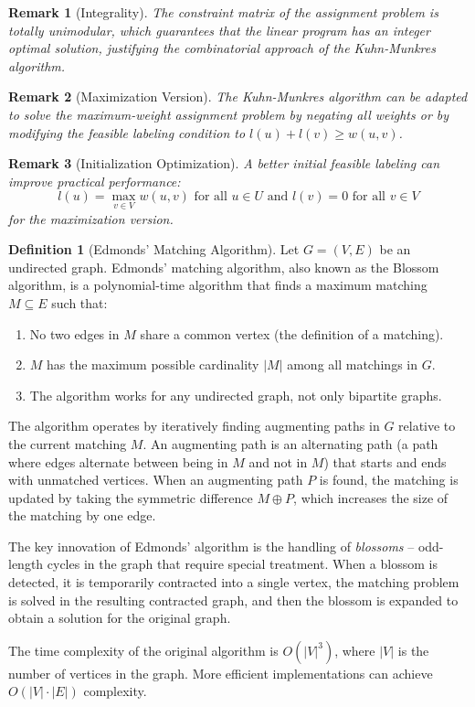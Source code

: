 \documentclass{article}
\newtheorem{remark}{Remark}
\theoremstyle{definition}
\newtheorem{definition}{Definition}
\begin{document}
\begin{remark}[Integrality]
The constraint matrix of the assignment problem is totally unimodular, which guarantees that the linear program has an integer optimal solution, justifying the combinatorial approach of the Kuhn-Munkres algorithm.
\end{remark}


\begin{remark}[Maximization Version]
The Kuhn-Munkres algorithm can be adapted to solve the maximum-weight assignment problem by negating all weights or by modifying the feasible labeling condition to $l(u) + l(v) \geq w(u,v)$.
\end{remark}

\begin{remark}[Initialization Optimization]
A better initial feasible labeling can improve practical performance:
\begin{equation}
l(u) = \max_{v \in V} w(u,v) \text{ for all } u \in U \text{ and } l(v) = 0 \text{ for all } v \in V
\end{equation}
for the maximization version.
\end{remark}
\begin{definition}[Edmonds' Matching Algorithm]
Let $G = (V, E)$ be an undirected graph. Edmonds' matching algorithm, also known as the Blossom algorithm, is a polynomial-time algorithm that finds a maximum matching $M \subseteq E$ such that:
\begin{enumerate}
  \item No two edges in $M$ share a common vertex (the definition of a matching).
  \item $M$ has the maximum possible cardinality $|M|$ among all matchings in $G$.
  \item The algorithm works for any undirected graph, not only bipartite graphs.
\end{enumerate}

The algorithm operates by iteratively finding augmenting paths in $G$ relative to the current matching $M$. An augmenting path is an alternating path (a path where edges alternate between being in $M$ and not in $M$) that starts and ends with unmatched vertices. When an augmenting path $P$ is found, the matching is updated by taking the symmetric difference $M \oplus P$, which increases the size of the matching by one edge.

The key innovation of Edmonds' algorithm is the handling of \textit{blossoms} -- odd-length cycles in the graph that require special treatment. When a blossom is detected, it is temporarily contracted into a single vertex, the matching problem is solved in the resulting contracted graph, and then the blossom is expanded to obtain a solution for the original graph.

The time complexity of the original algorithm is $O(|V|^3)$, where $|V|$ is the number of vertices in the graph. More efficient implementations can achieve $O(|V| \cdot |E|)$ complexity.
\end{definition}
\end{document}
